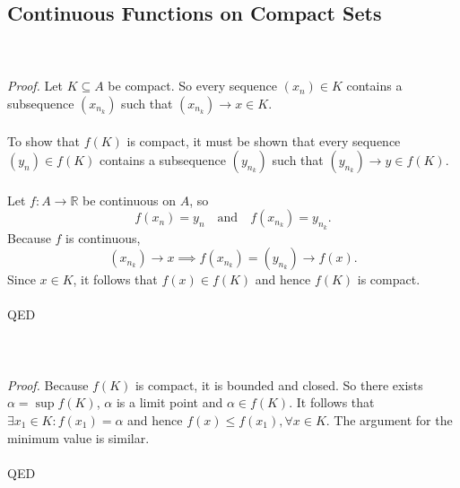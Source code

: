 \documentclass{article}
\begin{document}
            \subsection{Continuous Functions on Compact Sets}
            \\ \\
            \textit{Proof.} Let $K \subseteq A$ be compact. So every sequence $(x_n) \in K$ contains a subsequence $(x_{n_k})$ such that $(x_{n_k}) \to x \in K$. 
            \\ \\
            To show that $f(K)$ is compact, it must be shown that every sequence $(y_n) \in f(K)$ contains a subsequence $(y_{n_k})$ such that $(y_{n_k}) \to y \in f(K)$.
            \\ \\
            Let $f:A \to \mathbb{R}$ be continuous on $A$, so
            \begin{equation*}
                f(x_n) = y_n \quad \text{and} \quad f(x_{n_k}) = y_{n_k}.
            \end{equation*}
            Because $f$ is continuous, 
            \begin{equation*}
                (x_{n_k}) \to x \implies f(x_{n_k}) = (y_{n_k}) \to f(x).
            \end{equation*}
            Since $x \in K$, it follows that $f(x) \in f(K)$ and hence $f(K)$ is compact.
            \\ \\
            QED
            \\ \\
            \\ \\
            \textit{Proof.} Because $f(K)$ is compact, it is bounded and closed. So there exists $\alpha = \sup f(K)$, $\alpha$ is a limit point and $\alpha \in f(K)$. It follows that $\exists x_1 \in K: f(x_1) = \alpha$ and hence $f(x) \leq f(x_1), \forall x \in K$. The argument for the minimum value is similar.
            \\ \\
            QED
             
\end{document}
